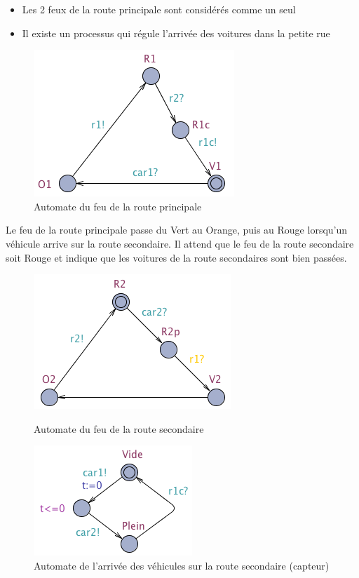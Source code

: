 \documentclass[pdftex,12pt,a4paper]{article}
\begin{document}
\begin{itemize}
	\item Les 2 feux de la route principale sont considérés comme un seul
	\item Il existe un processus qui régule l'arrivée des voitures dans la petite rue
\end{itemize}

\begin{figure}[H]
	\centering
	\includegraphics[scale=0.5]{ressources/part3/Q9-1.png}
	\caption{Automate du feu de la route principale}
\end{figure}

Le feu de la route principale passe du Vert au Orange, puis au Rouge lorsqu'un véhicule arrive sur la route secondaire. Il attend que le feu de la route secondaire soit Rouge et indique que les voitures de la route secondaires sont bien passées.

\begin{figure}[h]
    \begin{minipage}[c]{.46\linewidth}
		\centering
		\includegraphics[scale=0.5]{ressources/part3/Q9-2.png}
		\caption{Automate du feu de la route secondaire}
    \end{minipage}
    \hfill%
    \begin{minipage}[c]{.46\linewidth}
		\centering
		\includegraphics[scale=0.5]{ressources/part3/Q9-3.png}
		\caption{Automate de l'arrivée des véhicules sur la route secondaire (capteur)}
    \end{minipage}
\end{figure}
\end{document}
